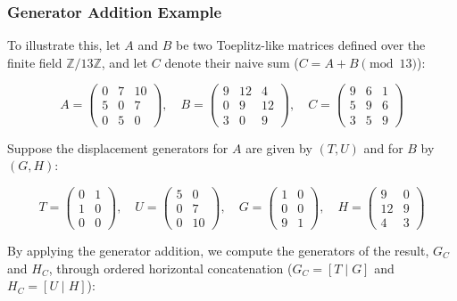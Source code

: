 \subsubsection{Generator Addition Example}

To illustrate this, let $A$ and $B$ be two Toeplitz-like matrices
defined over the finite field $\mathbb{Z}/13\mathbb{Z}$, and let $C$
denote their naive sum ($C = A + B \pmod{13}$):

\begin{equation*}
  A =
  \begin{pmatrix} 0 & 7 & 10 \\ 5 & 0 & 7 \\ 0 & 5 & 0
  \end{pmatrix}, \quad
  B =
  \begin{pmatrix} 9 & 12 & 4 \\ 0 & 9 & 12 \\ 3 & 0 & 9
  \end{pmatrix}, \quad
  C =
  \begin{pmatrix} 9 & 6 & 1 \\ 5 & 9 & 6 \\ 3 & 5 & 9
  \end{pmatrix}
\end{equation*}

\noindent
Suppose the displacement generators for $A$ are given by $(T, U)$ and
for $B$ by $(G, H)$:

\begin{equation*}
  T =
  \begin{pmatrix} 0 & 1 \\ 1 & 0 \\ 0 & 0
  \end{pmatrix}, \quad
  U =
  \begin{pmatrix} 5 & 0 \\ 0 & 7 \\ 0 & 10
  \end{pmatrix}, \quad
  G =
  \begin{pmatrix} 1 & 0 \\ 0 & 0 \\ 9 & 1
  \end{pmatrix}, \quad
  H =
  \begin{pmatrix} 9 & 0 \\ 12 & 9 \\ 4 & 3
  \end{pmatrix}
\end{equation*}

\noindent
By applying the generator addition, we compute the
generators of the result, $G_C$ and $H_C$, through ordered horizontal
concatenation ($G_C = [T \mid G]$ and $H_C = [U \mid H]$):

